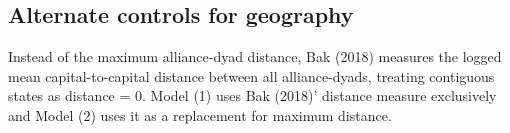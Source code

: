 \documentclass[
  letterpaper,
  DIV=11,
  numbers=noendperiod]{scrartcl}
\begin{document}
\newpage

\subsection{Alternate controls for
geography}\label{alternate-controls-for-geography}

Instead of the maximum alliance-dyad distance, Bak (2018) measures the
logged mean capital-to-capital distance between all alliance-dyads,
treating contiguous states as distance = 0. Model (1) uses Bak (2018)'
distance measure exclusively and Model (2) uses it as a replacement for
maximum distance.

\begin{table}

\caption{\label{tbl-altgeog}Coefficient estimates with alternate
geography variables.}

\centering{

}
\end{table}
\end{document}

